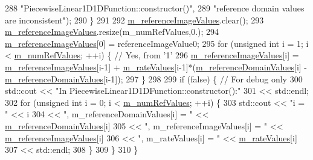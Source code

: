 \begin{DoxyCode}
288                         \textcolor{stringliteral}{"PiecewiseLinear1D1DFunction::constructor()"},
289                         \textcolor{stringliteral}{"reference domain values are inconsistent"});
290   \}
291 
292   \hyperlink{class_q_u_e_s_o_1_1_piecewise_linear1_d1_d_function_a83a27b74cb337be9d5b3e2b91d8ab6ad}{m\_referenceImageValues}.clear();
293   \hyperlink{class_q_u_e_s_o_1_1_piecewise_linear1_d1_d_function_a83a27b74cb337be9d5b3e2b91d8ab6ad}{m\_referenceImageValues}.resize(m\_numRefValues,0.);
294   \hyperlink{class_q_u_e_s_o_1_1_piecewise_linear1_d1_d_function_a83a27b74cb337be9d5b3e2b91d8ab6ad}{m\_referenceImageValues}[0] = referenceImageValue0;
295   \textcolor{keywordflow}{for} (\textcolor{keywordtype}{unsigned} \textcolor{keywordtype}{int} i = 1; i < \hyperlink{class_q_u_e_s_o_1_1_piecewise_linear1_d1_d_function_a1ff5c7e5243f6a763409a68e86681129}{m\_numRefValues}; ++i) \{ \textcolor{comment}{// Yes, from '1'}
296     \hyperlink{class_q_u_e_s_o_1_1_piecewise_linear1_d1_d_function_a83a27b74cb337be9d5b3e2b91d8ab6ad}{m\_referenceImageValues}[i] = \hyperlink{class_q_u_e_s_o_1_1_piecewise_linear1_d1_d_function_a83a27b74cb337be9d5b3e2b91d8ab6ad}{m\_referenceImageValues}[i-1] + 
      \hyperlink{class_q_u_e_s_o_1_1_piecewise_linear1_d1_d_function_aef7d37fe499c0e8f3bb6261f1b4e8147}{m\_rateValues}[i-1]*(\hyperlink{class_q_u_e_s_o_1_1_piecewise_linear1_d1_d_function_abda9e4143096bf0bf935b7c9173aa2cc}{m\_referenceDomainValues}[i] - 
      \hyperlink{class_q_u_e_s_o_1_1_piecewise_linear1_d1_d_function_abda9e4143096bf0bf935b7c9173aa2cc}{m\_referenceDomainValues}[i-1]);
297   \}
298 
299   \textcolor{keywordflow}{if} (\textcolor{keyword}{false}) \{ \textcolor{comment}{// For debug only}
300     std::cout << \textcolor{stringliteral}{"In PiecewiseLinear1D1DFunction::constructor():"}
301               << std::endl;
302     \textcolor{keywordflow}{for} (\textcolor{keywordtype}{unsigned} \textcolor{keywordtype}{int} i = 0; i < \hyperlink{class_q_u_e_s_o_1_1_piecewise_linear1_d1_d_function_a1ff5c7e5243f6a763409a68e86681129}{m\_numRefValues}; ++i) \{
303       std::cout << \textcolor{stringliteral}{"i = "} << i
304                 << \textcolor{stringliteral}{", m\_referenceDomainValues[i] = "} << \hyperlink{class_q_u_e_s_o_1_1_piecewise_linear1_d1_d_function_abda9e4143096bf0bf935b7c9173aa2cc}{m\_referenceDomainValues}[i]
305                 << \textcolor{stringliteral}{", m\_referenceImageValues[i] = "}  << \hyperlink{class_q_u_e_s_o_1_1_piecewise_linear1_d1_d_function_a83a27b74cb337be9d5b3e2b91d8ab6ad}{m\_referenceImageValues}[i]
306                 << \textcolor{stringliteral}{", m\_rateValues[i] = "}            << \hyperlink{class_q_u_e_s_o_1_1_piecewise_linear1_d1_d_function_aef7d37fe499c0e8f3bb6261f1b4e8147}{m\_rateValues}[i]
307                 << std::endl;
308     \}
309   \}
310 \}
\end{DoxyCode}

